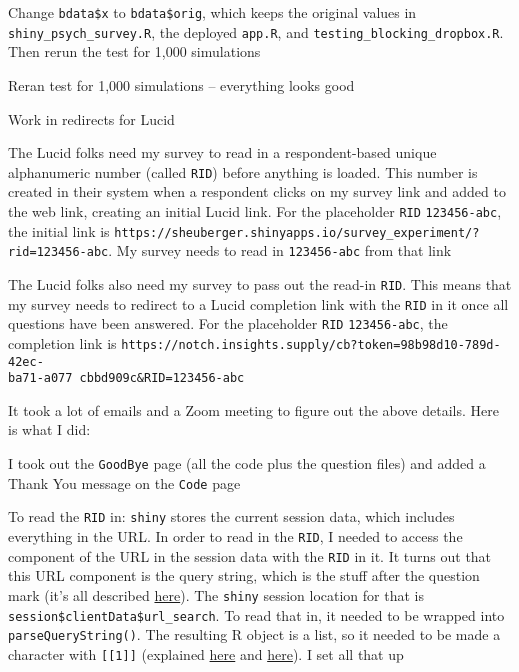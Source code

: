 \begin{coi}
\begin{coi}
\begin{coi}
						\item Change \texttt{bdata\$x} to \texttt{bdata\$orig}, which keeps the original values in \texttt{shiny\_psych\_survey.R}, the deployed \texttt{app.R}, and \texttt{testing\_blocking\_dropbox.R}. Then rerun the test for 1,000 simulations
						\item Reran test for 1,000 simulations -- everything looks good
					\end{coi}
			\end{coi} 
		\item Work in redirects for Lucid
			\begin{coi}
				\item The Lucid folks need my survey to read in a respondent-based unique alphanumeric number (called \texttt{RID}) before anything is loaded. This number is created in their system when a respondent clicks on my survey link and added to the web link, creating an initial Lucid link. For the placeholder \texttt{RID} \texttt{123456-abc}, the initial link is \texttt{https://sheuberger.shinyapps.io/survey\_experiment/?rid=123456-abc}. My survey needs to read in \texttt{123456-abc} from that link
				\item The Lucid folks also need my survey to pass out the read-in \texttt{RID}. This means that my survey needs to redirect to a Lucid completion link with the \texttt{RID} in it once all questions have been answered. For the placeholder \texttt{RID} \texttt{123456-abc}, the completion link is \texttt{https://notch.insights.supply/cb?token=98b98d10-789d-42ec-}\\\texttt{ba71-a077
						cbbd909c\&RID=123456-abc}
				\item It took a lot of emails and a Zoom meeting to figure out the above details. Here is what I did:
					\begin{coi}
						\item I took out the \texttt{GoodBye} page (all the code plus the question files) and added a Thank You message on the \texttt{Code} page
						\item To read the \texttt{RID} in: \texttt{shiny} stores the current session data, which includes everything in the URL. In order to read in the \texttt{RID}, I needed to access the component of the URL in the session data with the \texttt{RID} in it. It turns out that this URL component is the query string, which is the stuff after the question mark (it's all described \href{https://community.tealiumiq.com/t5/iQ-Tag-Management/URL-Components-Explained/ta-p/5573}{here}). The \texttt{shiny} session location for that is \texttt{session\$clientData\$url\_search}. To read that in, it needed to be wrapped into \texttt{parseQueryString()}. The resulting R object is a list, so it needed to be made a character with \texttt{[[1]]} (explained \href{https://shiny.rstudio.com/articles/client-data.html}{here} and \href{https://shiny.rstudio.com/reference/shiny/0.14/parseQueryString.html}{here}). I set all that up

\end{coi}
\end{coi}
\end{coi}
